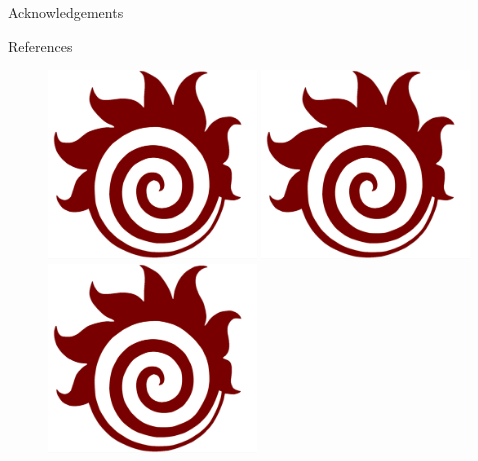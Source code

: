 \documentclass[22pt]{beamer}
\begin{document}
\begin{frame}[fragile]
\begin{textblock}{7.25}
\begin{block}{Acknowledgements}

\end{block}

\begin{block}{References}

{\scriptsize
}
\end{block}

\begin{figure}[htbp]
\centering
\includegraphics[height=5cm]{fireball-logo.png}
\hspace{1cm}
\includegraphics[height=5cm]{fireball-logo.png}
\hspace{1cm}
\includegraphics[height=5cm]{fireball-logo.png}

\end{figure}
\end{textblock}
\end{frame}
\end{document}
